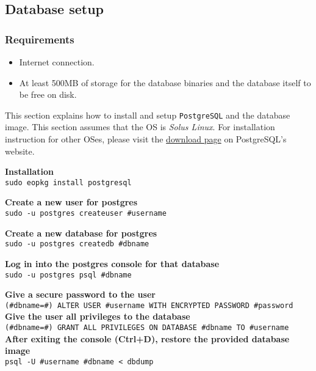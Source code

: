 \subsection{Database setup}
\subsubsection{Requirements}
\begin{itemize}
    \item Internet connection.
    \item At least 500MB of storage for the database binaries and the database itself to be free on disk.
\end{itemize}
This section explains how to install and setup \texttt{PostgreSQL} and the database image.
This section assumes that the OS is \textit{Solus Linux}. For installation instruction for other OSes, please visit the \href{https://www.postgresql.org/download/}{download page} on PostgreSQL's website.

\vspace{0.5em}
\noindent \textbf{Installation}\\
\texttt{sudo eopkg install postgresql}
\vspace{0.3em}

\noindent \textbf{Create a new user for postgres}\\
\texttt{sudo -u postgres createuser \#username}
\vspace{0.3em}

\noindent \textbf{Create a new database for postgres}\\
\texttt{sudo -u postgres createdb \#dbname}
\vspace{0.3em}

\noindent \textbf{Log in into the postgres console for that database}\\
\texttt{sudo -u postgres psql \#dbname}
\vspace{0.3em}

\noindent \textbf{Give a secure password to the user}\\
\texttt{(\#dbname=\#) ALTER USER \#username WITH ENCRYPTED PASSWORD \#password}\\

\noindent \textbf{Give the user all privileges to the database}\\
\texttt{(\#dbname=\#) GRANT ALL PRIVILEGES ON DATABASE \#dbname TO \#username}\\

\noindent \textbf{After exiting the console (Ctrl+D), restore the provided database image}\\
\texttt{psql -U \#username \#dbname < dbdump}
\vspace{0.5em}

